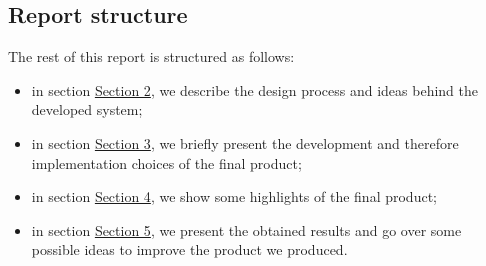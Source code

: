\documentclass[../../main]{subfiles}
\begin{document}
\subsection{Report structure}
\label{ss:report-structure}

The rest of this report is structured as follows:
\begin{itemize}
    \item in section \hyperref[s:design]{Section 2}, we describe the design process and ideas behind the developed system;
    \item in section \hyperref[s:development]{Section 3}, we briefly present the development and therefore implementation choices of the final product;
    \item in section \hyperref[s:app]{Section 4}, we show some highlights of the final product;
    \item in section \hyperref[s:results]{Section 5}, we present the obtained results and go over some possible ideas to improve the product we produced.
\end{itemize}
\end{document}

